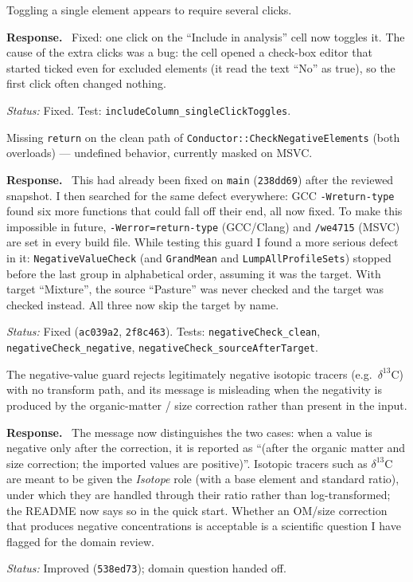 \documentclass[11pt]{article}
\newcommand{\code}[1]{\texttt{#1}}
\newcommand{\commit}[1]{\texttt{#1}}
\newcounter{cmt}
\newcounter{grp}
\renewcommand{\thecmt}{\thegrp.\arabic{cmt}}
\newenvironment{reviewer}[1]{%
  \refstepcounter{cmt}%
  \begin{tcolorbox}[enhanced,breakable,colback=commentbg,colframe=usgsgreen!60,
    boxrule=0.4pt,left=6pt,right=6pt,top=4pt,bottom=4pt,
    title={\small\textbf{Comment \thecmt}\hfill\textit{#1}},
    coltitle=black,colbacktitle=usgsgreen!15,fonttitle=\small]}%
  {\end{tcolorbox}}
\newenvironment{response}{\par\noindent\textbf{Response.}\ }{\par\medskip}
\newcommand{\status}[1]{\par\noindent\textit{Status:} #1\par}
\begin{document}
\begin{reviewer}{Tests, G3}
Toggling a single element appears to require several clicks.
\end{reviewer}
\begin{response}
Fixed: one click on the ``Include in analysis'' cell now toggles it. The
cause of the extra clicks was a bug: the cell opened a check-box editor that
started ticked even for excluded elements (it read the text ``No'' as true),
so the first click often changed nothing.
\end{response}
\status{Fixed. Test: \code{includeColumn\_\allowbreak{}singleClickToggles}.}

\begin{reviewer}{Email 10/15; Summary; Tests, Test 4c}
Missing \code{return} on the clean path of
\code{Conductor::\allowbreak{}CheckNegativeElements} (both overloads) — undefined behavior,
currently masked on MSVC.
\end{reviewer}
\begin{response}
This had already been fixed on \code{main} (\commit{238dd69}) after the
reviewed snapshot. I then searched for the same defect everywhere: GCC
\code{-Wreturn-type} found six more functions that could fall off their end,
all now fixed. To make this impossible in future, \code{-Werror=return-type}
(GCC/Clang) and \code{/\allowbreak{}we4715} (MSVC) are set in every build file.
While testing this guard I found a more serious defect in it:
\code{NegativeValueCheck} (and \code{GrandMean} and \code{LumpAllProfileSets})
stopped before the last group in alphabetical order, assuming it was the
target. With target ``Mixture'', the source ``Pasture'' was never checked and
the target was checked instead. All three now skip the target by name.
\end{response}
\status{Fixed (\commit{ac039a2}, \commit{2f8c463}). Tests: \code{negativeCheck\_\allowbreak{}clean},
\code{negativeCheck\_\allowbreak{}negative}, \code{negativeCheck\_\allowbreak{}sourceAfterTarget}.}

\begin{reviewer}{Tests, preprocessing note and Test 4 addendum}
The negative-value guard rejects legitimately negative isotopic tracers
(e.g.\ $\delta^{13}$C) with no transform path, and its message is
misleading when the negativity is produced by the organic-matter / size
correction rather than present in the input.
\end{reviewer}
\begin{response}
The message now distinguishes the two cases: when a value is negative only
after the correction, it is reported as ``(after the organic matter and size
correction; the imported values are positive)''. Isotopic tracers such as
$\delta^{13}$C are meant to be given the \emph{Isotope} role (with a base
element and standard ratio), under which they are handled through their
ratio rather than log-transformed; the README now says so in the quick
start. Whether an OM/size correction that produces negative concentrations
is acceptable is a scientific question I have flagged for the domain review.
\end{response}
\status{Improved (\commit{538ed73}); domain question handed off.}
\end{document}
